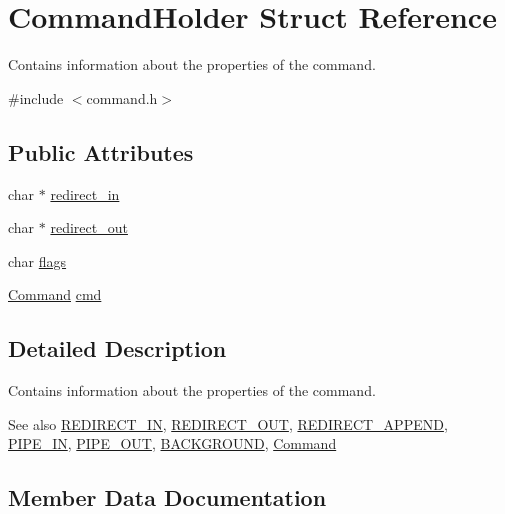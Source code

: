 \hypertarget{structCommandHolder}{}\section{Command\+Holder Struct Reference}
\label{structCommandHolder}


Contains information about the properties of the command.  




{\ttfamily \#include $<$command.\+h$>$}

\subsection*{Public Attributes}
\begin{DoxyCompactItemize}
\item 
char $\ast$ \hyperlink{structCommandHolder_a3691bd22096644e8c6be327fc7d0d246}{redirect\+\_\+in}
\item 
char $\ast$ \hyperlink{structCommandHolder_ac7bfc3e78a8e8b511e2b324c45a17d6f}{redirect\+\_\+out}
\item 
char \hyperlink{structCommandHolder_acb381d6ab29bc574dc1ff452adc7847a}{flags}
\item 
\hyperlink{unionCommand}{Command} \hyperlink{structCommandHolder_a83a7e82024a6f736ffebed0792aa12a9}{cmd}
\end{DoxyCompactItemize}


\subsection{Detailed Description}
Contains information about the properties of the command. 

\begin{DoxySeeAlso}{See also}
\hyperlink{command_8h_ab6714acca9cb634f10b7f5a23c349e3e}{R\+E\+D\+I\+R\+E\+C\+T\+\_\+\+IN}, \hyperlink{command_8h_af178f598332c2233dfbdc334a05a2a66}{R\+E\+D\+I\+R\+E\+C\+T\+\_\+\+O\+UT}, \hyperlink{command_8h_a6b682fe2ba1a0c489d50822c3feecdac}{R\+E\+D\+I\+R\+E\+C\+T\+\_\+\+A\+P\+P\+E\+ND}, \hyperlink{command_8h_a3fc15bc38c2cd3ce6f7dd40f4c0115dd}{P\+I\+P\+E\+\_\+\+IN}, \hyperlink{command_8h_af2aa1b20c10d6507c47f11588e21c324}{P\+I\+P\+E\+\_\+\+O\+UT}, \hyperlink{command_8h_a850b2f07a67b73890889e63fb8a49fda}{B\+A\+C\+K\+G\+R\+O\+U\+ND}, \hyperlink{unionCommand}{Command} 
\end{DoxySeeAlso}


\subsection{Member Data Documentation}
